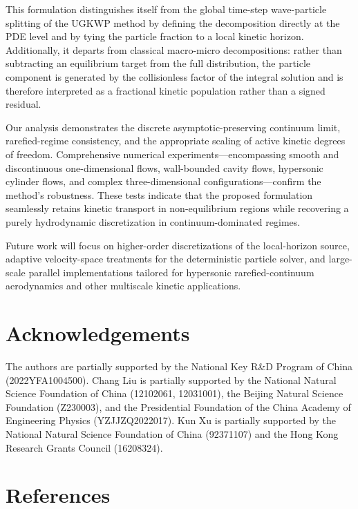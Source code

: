 \documentclass[preprint,12pt]{elsarticle}
\begin{document}
This formulation distinguishes itself from the global time-step wave-particle splitting of the UGKWP method by defining the decomposition directly at the PDE level and by tying the particle fraction to a local kinetic horizon. Additionally, it departs from classical macro-micro decompositions: rather than subtracting an equilibrium target from the full distribution, the particle component is generated by the collisionless factor of the integral solution and is therefore interpreted as a fractional kinetic population rather than a signed residual.

Our analysis demonstrates the discrete asymptotic-preserving continuum limit, rarefied-regime consistency, and the appropriate scaling of active kinetic degrees of freedom. Comprehensive numerical experiments---encompassing smooth and discontinuous one-dimensional flows, wall-bounded cavity flows, hypersonic cylinder flows, and complex three-dimensional configurations---confirm the method's robustness. These tests indicate that the proposed formulation seamlessly retains kinetic transport in non-equilibrium regions while recovering a purely hydrodynamic discretization in continuum-dominated regimes.

Future work will focus on higher-order discretizations of the local-horizon source, adaptive velocity-space treatments for the deterministic particle solver, and large-scale parallel implementations tailored for hypersonic rarefied-continuum aerodynamics and other multiscale kinetic applications.




\section*{Acknowledgements}

The authors are partially supported by the National Key R\&D Program of China (2022YFA1004500). Chang Liu is partially supported by the National Natural Science Foundation of China (12102061, 12031001), the Beijing Natural Science Foundation (Z230003), and the Presidential Foundation of the China Academy of Engineering Physics (YZJJZQ2022017). Kun Xu is partially supported by the National Natural Science Foundation of China (92371107) and the Hong Kong Research Grants Council (16208324).

\clearpage
\section*{References}
\end{document}
